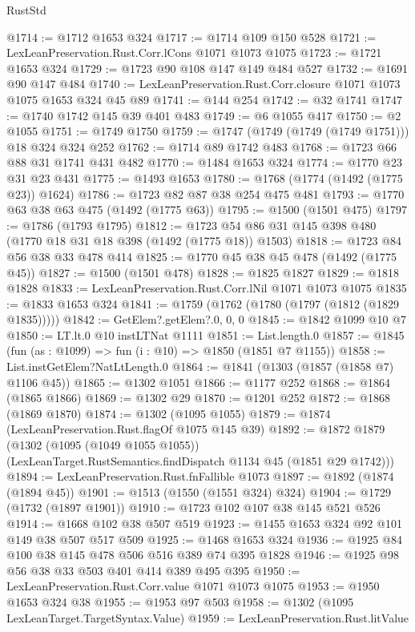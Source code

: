 \begin{lexlean}{RustStd}
\begin{coremodule}
@1714 := @1712 @1653 @324
@1717 := @1714 @109 @150 @528
@1721 := LexLeanPreservation.Rust.Corr.lCons @1071 @1073 @1075
@1723 := @1721 @1653 @324
@1729 := @1723 @90 @108 @147 @149 @484 @527
@1732 := @1691 @90 @147 @484
@1740 := LexLeanPreservation.Rust.Corr.closure @1071 @1073 @1075 @1653 @324 @45 @89
@1741 := @144 @254
@1742 := @32 @1741
@1747 := @1740 @1742 @145 @39 @401 @483
@1749 := @6 @1055 @417
@1750 := @2 @1055
@1751 := @1749 @1750
@1759 := @1747 (@1749 (@1749 (@1749 @1751))) @18 @324 @324 @252
@1762 := @1714 @89 @1742 @483
@1768 := @1723 @66 @88 @31 @1741 @431 @482
@1770 := @1484 @1653 @324
@1774 := @1770 @23 @31 @23 @431
@1775 := @1493 @1653
@1780 := @1768 (@1774 (@1492 (@1775 @23)) @1624)
@1786 := @1723 @82 @87 @38 @254 @475 @481
@1793 := @1770 @63 @38 @63 @475 (@1492 (@1775 @63))
@1795 := @1500 (@1501 @475)
@1797 := @1786 (@1793 @1795)
@1812 := @1723 @54 @86 @31 @145 @398 @480 (@1770 @18 @31 @18 @398 (@1492 (@1775 @18)) @1503)
@1818 := @1723 @84 @56 @38 @33 @478 @414
@1825 := @1770 @45 @38 @45 @478 (@1492 (@1775 @45))
@1827 := @1500 (@1501 @478)
@1828 := @1825 @1827
@1829 := @1818 @1828
@1833 := LexLeanPreservation.Rust.Corr.lNil @1071 @1073 @1075
@1835 := @1833 @1653 @324
@1841 := @1759 (@1762 (@1780 (@1797 (@1812 (@1829 @1835)))))
@1842 := GetElem?.getElem?.{0, 0, 0}
@1845 := @1842 @1099 @10 @7
@1850 := LT.lt.{0} @10 instLTNat @1111
@1851 := List.length.{0}
@1857 := @1845 (fun (as : @1099) => fun (i : @10) => @1850 (@1851 @7 @1155))
@1858 := List.instGetElem?NatLtLength.{0}
@1864 := @1841 (@1303 (@1857 (@1858 @7) @1106 @45))
@1865 := @1302 @1051
@1866 := @1177 @252
@1868 := @1864 (@1865 @1866)
@1869 := @1302 @29
@1870 := @1201 @252
@1872 := @1868 (@1869 @1870)
@1874 := @1302 (@1095 @1055)
@1879 := @1874 (LexLeanPreservation.Rust.flagOf @1075 @145 @39)
@1892 := @1872
    @1879
    (@1302
      (@1095 (@1049 @1055 @1055))
      (LexLeanTarget.RustSemantics.findDispatch @1134 @45 (@1851 @29 @1742)))
@1894 := LexLeanPreservation.Rust.fnFallible @1073
@1897 := @1892 (@1874 (@1894 @45))
@1901 := @1513 (@1550 (@1551 @324) @324)
@1904 := @1729 (@1732 (@1897 @1901))
@1910 := @1723 @102 @107 @38 @145 @521 @526
@1914 := @1668 @102 @38 @507 @519
@1923 := @1455 @1653 @324 @92 @101 @149 @38 @507 @517 @509
@1925 := @1468 @1653 @324
@1936 := @1925 @84 @100 @38 @145 @478 @506 @516 @389 @74 @395 @1828
@1946 := @1925 @98 @56 @38 @33 @503 @401 @414 @389 @495 @395
@1950 := LexLeanPreservation.Rust.Corr.value @1071 @1073 @1075
@1953 := @1950 @1653 @324 @38
@1955 := @1953 @97 @503
@1958 := @1302 (@1095 LexLeanTarget.TargetSyntax.Value)
@1959 := LexLeanPreservation.Rust.litValue

\end{coremodule}
\end{lexlean}
